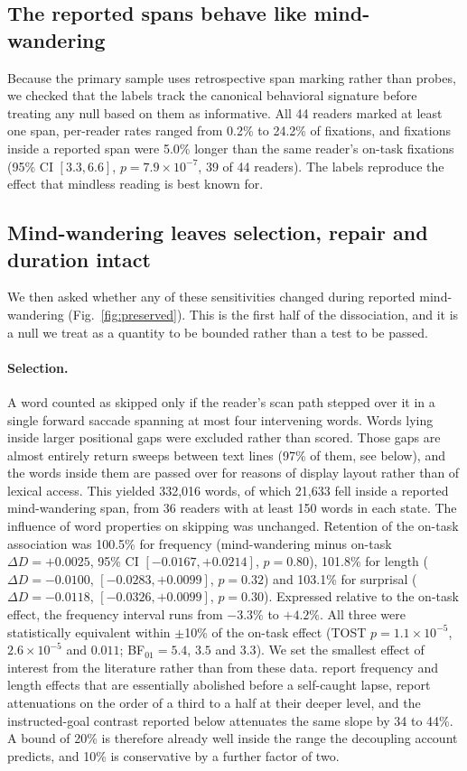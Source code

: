 \documentclass[11pt]{article}
\begin{document}
\subsection{The reported spans behave like mind-wandering}

Because the primary sample uses retrospective span marking rather than probes, we checked that
the labels track the canonical behavioral signature before treating any null based on them as
informative. All 44 readers marked at least one span, per-reader rates ranged from 0.2\% to
24.2\% of fixations, and fixations inside a reported span were 5.0\% longer than the same
reader's on-task fixations (95\% CI $[3.3, 6.6]$, $p=7.9\times10^{-7}$, 39 of 44 readers). The
labels reproduce the effect that mindless reading is best known for.

\subsection{Mind-wandering leaves selection, repair and duration intact}

We then asked whether any of these sensitivities changed during reported mind-wandering
(Fig.~\ref{fig:preserved}). This is the first half of the dissociation, and it is a null we
treat as a quantity to be bounded rather than a test to be passed.

\paragraph{Selection.} A word counted as skipped only if the reader's scan path stepped over
it in a single forward saccade spanning at most four intervening words. Words lying inside larger positional gaps were excluded rather than scored. Those gaps are almost
entirely return sweeps between text lines (97\% of them, see below), and the words inside them are
passed over for reasons of display layout rather than of lexical access. This yielded 332{,}016 words, of which 21{,}633 fell inside a reported
mind-wandering span, from 36 readers with at least 150 words in each state. The influence of
word properties on skipping was unchanged. Retention of the on-task association was 100.5\%
for frequency (mind-wandering minus on-task $\Delta D=+0.0025$, 95\% CI $[-0.0167, +0.0214]$,
$p=0.80$), 101.8\% for length ($\Delta D=-0.0100$, $[-0.0283, +0.0099]$, $p=0.32$) and 103.1\%
for surprisal ($\Delta D=-0.0118$, $[-0.0326, +0.0099]$, $p=0.30$). Expressed relative to the
on-task effect, the frequency interval runs from $-3.3\%$ to $+4.2\%$. All three were
statistically equivalent within $\pm$10\% of the on-task effect
(TOST $p=1.1\times10^{-5}$, $2.6\times10^{-5}$ and $0.011$; BF$_{01}=5.4$, $3.5$ and $3.3$).
We set the smallest effect of interest from the literature rather than from these data.
\citet{reichle2010} report frequency and length effects that are essentially abolished before a
self-caught lapse, \citet{schad2012} report attenuations on the order of a third to a half at
their deeper level, and the instructed-goal contrast reported below attenuates the same slope by
34 to 44\%. A bound of 20\% is therefore already well inside the range the decoupling account
predicts, and 10\% is conservative by a further factor of two.
\end{document}
